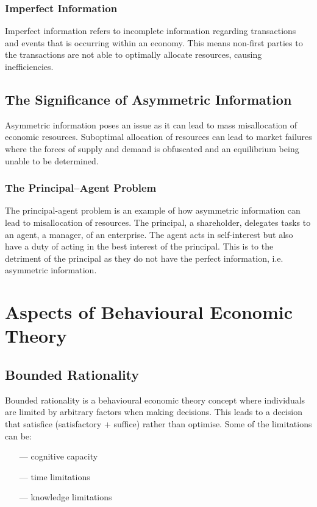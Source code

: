 \documentclass[a4paper,10pt]{article}
\begin{document}
\begin{multicols*}{2}
	\subsubsection{Imperfect Information}
	Imperfect information refers to incomplete information regarding transactions and events that is occurring within an economy. This means non-first parties to the transactions are not able to optimally allocate resources, causing inefficiencies.

	\subsection{The Significance of Asymmetric Information}
	Asymmetric information poses an issue as it can lead to mass misallocation of economic resources. Suboptimal allocation of resources can lead to market failures where the forces of supply and demand is obfuscated and an equilibrium being unable to be determined.

	\subsubsection{The Principal–Agent Problem}
	The principal-agent problem is an example of how asymmetric information can lead to misallocation of resources. The principal, a shareholder, delegates tasks to an agent, a manager, of an enterprise. The agent acts in self-interest but also have a duty of acting in the best interest of the principal. This is to the detriment of the principal as they do not have the perfect information, i.e. asymmetric information.

	\section{Aspects of Behavioural Economic Theory}
	\subsection{Bounded Rationality}
	Bounded rationality is a behavioural economic theory concept where individuals are limited by arbitrary factors when making decisions. This leads to a decision that satisfice (satisfactory + suffice) rather than optimise. Some of the limitations can be:
	\begin{itemize}
		\item[---] cognitive capacity
		\item[---] time limitations
		\item[---] knowledge limitations
	\end{itemize}
	\medskip


\end{multicols*}
\end{document}
